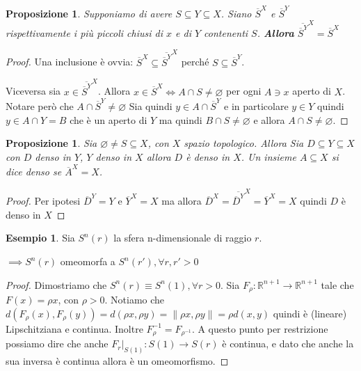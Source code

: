 \documentclass{article}
\newcounter{theo}[section]\setcounter{theo}{0}
\newcounter{excounter}[section]\setcounter{excounter}{0}
\theoremstyle{plain}
\newtheorem{proposition}[theo]{Proposizione}
\theoremstyle{definition}
\newtheorem{example}[excounter]{Esempio}
\theoremstyle{remark}
\begin{document}
\begin{proposition}
    Supponiamo di avere \(S \subseteq Y \subseteq X  \). Siano
    \(\overline{S}^{X}\) e \(\overline{S}^{Y}\) rispettivamente i più piccoli
    chiusi di \(x\) e di \(Y\) contenenti \(S\).
    \textbf{Allora} \(\overline{\overline{S}^{Y}}^{X} = \overline{S}^{X}\) 
\end{proposition}
\begin{proof}
    Una inclusione è ovvia: \(\overline{S}^{X} \subseteq
    \overline{\overline{S}^{Y}}^{X} \) perché \(S \subseteq \overline{S}^{Y} \).

    Viceversa sia \(x \in \overline{\overline{S}^{Y}}^{X}\). Allora \(x \in
    \overline{S}^{X} \iff A \cap S \neq \varnothing\) per ogni \(A \ni x\) aperto di
    \(X\). Notare però che \(A \cap \overline{S}^{Y} \neq \varnothing\) Sia
    quindi \(y \in  A \cap  \overline{S}^{Y}\) e in particolare \(y \in Y\)
    quindi \(y \in A \cap Y = B\) che è un aperto di \(Y\) ma quindi \(B \cap  S
    \neq \varnothing\) e allora \(A \cap S \neq \varnothing\).
\end{proof}

\begin{proposition}
    Sia \(\varnothing \neq S \subseteq X \), con \(X\) spazio topologico. Allora
    Sia \(D \subseteq Y \subseteq X  \) con \(D\) denso in \(Y\), \(Y\) denso in
    \(X\) allora \(D\) è denso in \(X\). Un insieme \(A \subseteq X \) si dice
    denso se \(\overline{A}^{X} = X\).
\end{proposition}
\begin{proof}
    Per ipotesi \(\overline{D}^{Y} = Y\) e \(\overline{Y}^{X} = X\) ma allora
    \(\overline{D}^{X} = \overline{\overline{D}^{Y}}^{X} = \overline{Y}^{X} =
    X\) quindi \(D\) è denso in \(X\) 
\end{proof}


\begin{example}
    Sia \(S^{n}(r)\) la sfera n-dimensionale di raggio \(r\).

    \(\implies  S^{n}(r)\) omeomorfa a \(S^{n}(r'), \forall r, r' > 0\) 
\end{example}
\begin{proof}
    Dimostriamo che \(S^{n}(r) \equiv S^{n}(1), \forall r > 0\). Sia \(F_\rho :
    \mathbb{R}^{n+1} \to  \mathbb{R}^{n+1}\) tale che \(F(x) = \rho x\), con
    \(\rho > 0\). Notiamo che \(d(F_\rho (x), F_\rho(y)) = d(\rho x, \rho y) =
    \| \rho x, \rho y\| = \rho d(x, y)\) quindi è (lineare) Lipschitziana e continua.
    Inoltre \(F_\rho ^{-1} = F_{\rho ^{-1}}\). A questo punto per restrizione
    possiamo dire che anche \(F_r|_{S(1)} : S(1) \to S(r)\) è continua, e dato
    che anche la sua inversa è continua allora è un omeomorfismo.
\end{proof}
\end{document}
